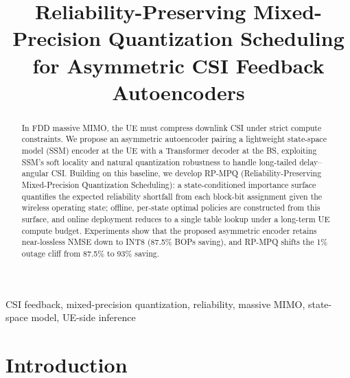 \documentclass[conference]{IEEEtran}
\begin{document}
\title{
Reliability-Preserving Mixed-Precision Quantization Scheduling for Asymmetric CSI Feedback Autoencoders
}

\author{
}

\maketitle

\begin{abstract}
In FDD massive MIMO, the UE must compress downlink CSI under strict compute constraints.
We propose an asymmetric autoencoder pairing a lightweight state-space model (SSM) encoder at the UE with a Transformer decoder at the BS, exploiting SSM's soft locality and natural quantization robustness to handle long-tailed delay--angular CSI.
Building on this baseline, we develop RP-MPQ (Reliability-Preserving Mixed-Precision Quantization Scheduling): a state-conditioned importance surface quantifies the expected reliability shortfall from each block-bit assignment given the wireless operating state; offline, per-state optimal policies are constructed from this surface, and online deployment reduces to a single table lookup under a long-term UE compute budget.
Experiments show that the proposed asymmetric encoder retains near-lossless NMSE down to INT8 (87.5\% BOPs saving), and RP-MPQ shifts the 1\% outage cliff from 87.5\% to 93\% saving.
\end{abstract}

\begin{IEEEkeywords}
CSI feedback, mixed-precision quantization, reliability, massive MIMO, state-space model, UE-side inference
\end{IEEEkeywords}

\section{Introduction}
\end{document}

